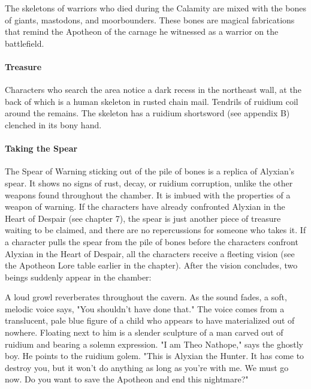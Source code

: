 \documentclass[10pt,a4,twoside,twocolumn,openany,nodeprecatedcode]{dndbook}
\begin{document}
The skeletons of warriors who died during the Calamity are mixed with the bones of giants, mastodons, and moorbounders. These bones are magical fabrications that remind the Apotheon of the carnage he witnessed as a warrior on the battlefield.
\paragraph{Treasure}
Characters who search the area notice a dark recess in the northeast wall, at the back of which is a human skeleton in rusted chain mail. Tendrils of ruidium coil around the remains. The skeleton has a ruidium shortsword (see appendix B) clenched in its bony hand.
\paragraph{Taking the Spear}
The Spear of Warning sticking out of the pile of bones is a replica of Alyxian's spear. It shows no signs of rust, decay, or ruidium corruption, unlike the other weapons found throughout the chamber. It is imbued with the properties of a weapon of warning. If the characters have already confronted Alyxian in the Heart of Despair (see chapter 7), the spear is just another piece of treasure waiting to be claimed, and there are no repercussions for someone who takes it.
If a character pulls the spear from the pile of bones before the characters confront Alyxian in the Heart of Despair, all the characters receive a fleeting vision (see the Apotheon Lore table earlier in the chapter). After the vision concludes, two beings suddenly appear in the chamber:
\begin{DndReadAloud}{}
A loud growl reverberates throughout the cavern. As the sound fades, a soft, melodic voice says, "You shouldn't have done that." The voice comes from a translucent, pale blue figure of a child who appears to have materialized out of nowhere. Floating next to him is a slender sculpture of a man carved out of ruidium and bearing a solemn expression.
"I am Theo Nathope," says the ghostly boy. He points to the ruidium golem. "This is Alyxian the Hunter. It has come to destroy you, but it won't do anything as long as you're with me. We must go now. Do you want to save the Apotheon and end this nightmare?"
\end{DndReadAloud}
\end{document}
